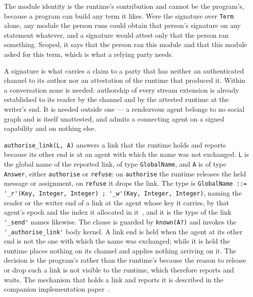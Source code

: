 The module identity is the runtime's contribution and cannot be the program's, because a program can build any term it likes. Were the signature over \verb|Term| alone, any module the person runs could obtain that person's signature on any statement whatever, and a signature would attest only that the person ran something. Scoped, it says that the person ran this module and that this module asked for this term, which is what a relying party needs.

A signature is what carries a claim to a party that has neither an authenticated channel to its author nor an attestation of the runtime that produced it. Within a conversation none is needed: authorship of every stream extension is already established to its reader by the channel and by the attested runtime at the writer's end. It is needed outside one --- a rendezvous agent belongs to no social graph and is itself unattested, and admits a connecting agent on a signed capability and on nothing else.

\verb|authorise_link(L, A)| answers a link that the runtime holds and reports because its other end is at an agent with which the name was not exchanged. \verb|L| is the global name of the reported link, of type \verb|GlobalName|, and \verb|A| is of type \verb|Answer|, either \verb|authorise| or \verb|refuse|: on \verb|authorise| the runtime releases the held message or assignment, on \verb|refuse| it drops the link. The type is \verb|GlobalName ::= '_r'(Key, Integer, Integer) ; '_w'(Key, Integer, Integer)|, naming the reader or the writer end of a link at the agent whose key it carries, by that agent's epoch and the index it allocated in it~\cite{shapiro2026implementing}, and it is the type of the link \verb|'_send'| names likewise. The clause is guarded by \verb|known(A?)| and invokes the \verb|'_authorise_link'| body kernel. A link end is held when the agent at its other end is not the one with which the name was exchanged; while it is held the runtime places nothing on its channel and applies nothing arriving on it. The decision is the program's rather than the runtime's because the reason to release or drop such a link is not visible to the runtime, which therefore reports and waits. The mechanism that holds a link and reports it is described in the companion implementation paper~\cite{shapiro2026implementing}.

